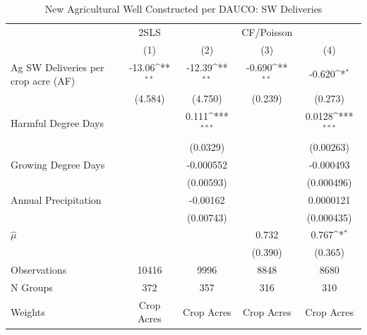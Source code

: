 \begin{table}[htbp]\centering
\def\sym#1{\ifmmode^{#1}\else\(^{#1}\)\fi}
\caption{New Agricultural Well Constructed per DAUCO: SW Deliveries}
\begin{tabular}{l*{4}{c}}
\hline\hline
                    &        2SLS         &                     &  CF/Poisson         &                     \\
                    &\multicolumn{1}{c}{(1)}         &\multicolumn{1}{c}{(2)}         &\multicolumn{1}{c}{(3)}         &\multicolumn{1}{c}{(4)}         \\
\hline
Ag SW Deliveries per crop acre (AF)&      -13.06\sym{**} &      -12.39\sym{**} &      -0.690\sym{**} &      -0.620\sym{*}  \\
                    &     (4.584)         &     (4.750)         &     (0.239)         &     (0.273)         \\
[1em]
Harmful Degree Days &                     &       0.111\sym{***}&                     &      0.0128\sym{***}\\
                    &                     &    (0.0329)         &                     &   (0.00263)         \\
[1em]
Growing Degree Days &                     &   -0.000552         &                     &   -0.000493         \\
                    &                     &   (0.00593)         &                     &  (0.000496)         \\
[1em]
Annual Precipitation&                     &    -0.00162         &                     &   0.0000121         \\
                    &                     &   (0.00743)         &                     &  (0.000435)         \\
[1em]
$\hat{\mu}$         &                     &                     &       0.732         &       0.767\sym{*}  \\
                    &                     &                     &     (0.390)         &     (0.365)         \\
\hline
Observations        &       10416         &        9996         &        8848         &        8680         \\
N Groups            &         372         &         357         &         316         &         310         \\
Weights             &  Crop Acres         &  Crop Acres         &  Crop Acres         &  Crop Acres         \\

\end{tabular}
\end{table}
